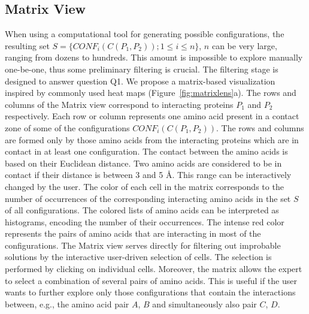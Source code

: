 \documentclass{bmcart}
\def\MatView {Matrix view\xspace}
\begin{document}

\subsection*{Matrix View}
\label{sec:matview}
When using a computational tool for generating possible configurations, the resulting set $S = \{CONF_i(C(P_1,P_2)); 1 \leq i \leq n\}$, $n$ can be very large, ranging from dozens to hundreds. 
This amount is impossible to explore manually one-be-one, thus some preliminary filtering is crucial.
The filtering stage is designed to answer question Q1.
We propose a matrix-based visualization inspired by commonly used heat maps (Figure~\ref{fig:matrixlens}a).
The rows and columns of the \MatView correspond to interacting proteins $P_1$ and $P_2$ respectively.
Each row or column represents one amino acid present in a contact zone of some of the configurations $CONF_i(C(P_1,P_2))$. 
The rows and columns are formed only by those amino acids from the interacting proteins which are in contact in at least one configuration.
The contact between the amino acids is based on their Euclidean distance. 
Two amino acids are considered to be in contact if their distance is between 3 and 5 \AA.
This range can be interactively changed by the user.
The color of each cell in the matrix corresponds to the number of occurrences of the corresponding interacting amino acids in the set $S$ of all configurations. 
The colored lists of amino acids can be interpreted as histograms, encoding the number of their occurrences.
The intense red color represents the pairs of amino acids that are interacting in most of the configurations.
The \MatView serves directly for filtering out improbable solutions by the interactive user-driven selection of cells.
The selection is performed by clicking on individual cells. 
Moreover, the matrix allows the expert to select a combination of several pairs of amino acids.
This is useful if the user wants to further explore only those configurations that contain the interactions between, e.g., the amino acid pair $A$, $B$ and simultaneously also pair $C$, $D$. 

\end{document}
